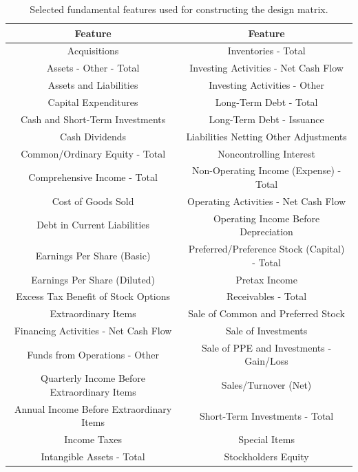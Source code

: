 \documentclass[pdflatex,sn-mathphys-num]{sn-jnl}%
\theoremstyle{thmstyleone}%
\theoremstyle{thmstyletwo}%
\theoremstyle{thmstylethree}%
\begin{document}
\begin{table}
	\centering
	\small
	\caption{Selected fundamental features used for constructing the design matrix.}
	\label{Fundamentals}
	\begin{tabular}{c|c} 
		\toprule
		Feature & Feature \\
		\hline
		Acquisitions & Inventories - Total \\
		Assets - Other - Total & Investing Activities - Net Cash Flow \\
		Assets and Liabilities & Investing Activities - Other \\
		Capital Expenditures & Long-Term Debt - Total \\
		Cash and Short-Term Investments & Long-Term Debt - Issuance \\
		Cash Dividends & Liabilities Netting Other Adjustments \\
		Common/Ordinary Equity - Total & Noncontrolling Interest \\
		Comprehensive Income - Total & Non-Operating Income (Expense) - Total \\
		Cost of Goods Sold & Operating Activities - Net Cash Flow \\
		Debt in Current Liabilities & Operating Income Before Depreciation \\
		Earnings Per Share (Basic) & Preferred/Preference Stock (Capital) - Total \\
		Earnings Per Share (Diluted) & Pretax Income \\
		Excess Tax Benefit of Stock Options & Receivables - Total \\
		Extraordinary Items & Sale of Common and Preferred Stock \\
		Financing Activities - Net Cash Flow & Sale of Investments \\
		Funds from Operations - Other & Sale of PPE and Investments - Gain/Loss \\
		Quarterly Income Before Extraordinary Items & Sales/Turnover (Net) \\
		Annual Income Before Extraordinary Items & Short-Term Investments - Total \\
		Income Taxes & Special Items \\
		Intangible Assets - Total & Stockholders Equity \\
		\bottomrule
	\end{tabular}
\end{table}
\end{document}
